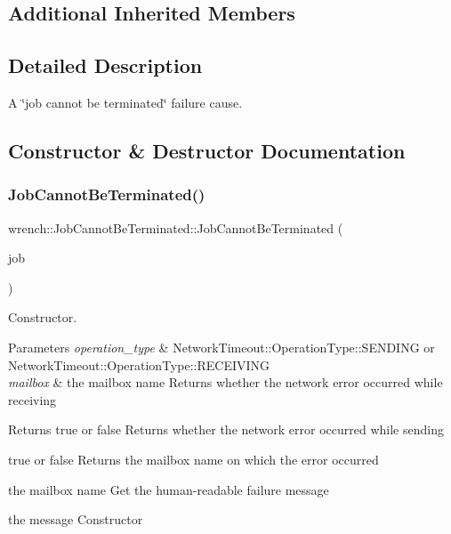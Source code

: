 \subsection*{Additional Inherited Members}


\subsection{Detailed Description}
A \char`\"{}job cannot be terminated\char`\"{} failure cause. 

\subsection{Constructor \& Destructor Documentation}
\mbox{\label{classwrench_1_1_job_cannot_be_terminated_a429e5ff2482d19fc013ea2453307a82b}} 
\subsubsection{\texorpdfstring{Job\+Cannot\+Be\+Terminated()}{JobCannotBeTerminated()}}
{\footnotesize\ttfamily wrench\+::\+Job\+Cannot\+Be\+Terminated\+::\+Job\+Cannot\+Be\+Terminated (\begin{DoxyParamCaption}\item[{\hyperlink{classwrench_1_1_workflow_job}{Workflow\+Job} $\ast$}]{job }\end{DoxyParamCaption})}



Constructor. 


\begin{DoxyParams}{Parameters}
{\em operation\+\_\+type} & Network\+Timeout\+::\+Operation\+Type\+::\+S\+E\+N\+D\+I\+NG or Network\+Timeout\+::\+Operation\+Type\+::\+R\+E\+C\+E\+I\+V\+I\+NG \\
\hline
{\em mailbox} & the mailbox name Returns whether the network error occurred while receiving \\
\hline
\end{DoxyParams}
\begin{DoxyReturn}{Returns}
true or false Returns whether the network error occurred while sending 

true or false Returns the mailbox name on which the error occurred 

the mailbox name Get the human-\/readable failure message 

the message Constructor
\end{DoxyReturn}

